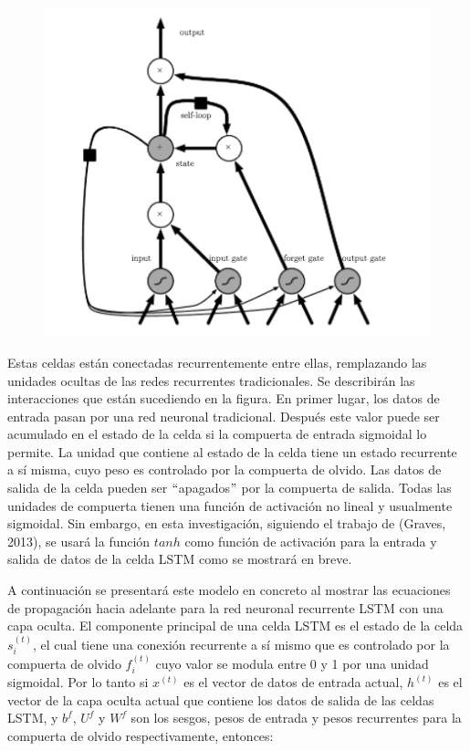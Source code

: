 \begin{figure}[h]
\begin{center}
\includegraphics{./imag/lstm.png}
\end{center}
\caption{}
\end{figure}

Estas celdas están conectadas recurrentemente entre ellas, remplazando las unidades ocultas de las redes recurrentes tradicionales. Se describirán las interacciones que están sucediendo en la figura. En primer lugar, los datos de entrada pasan por una red neuronal tradicional. Después este valor puede ser acumulado en el estado de la celda si la compuerta de entrada sigmoidal lo permite. La unidad que contiene al estado de la celda tiene un estado recurrente a sí misma, cuyo peso es controlado por la compuerta de olvido. Las datos de salida de la celda pueden ser $``$apagados$"$ por la compuerta de salida. Todas las unidades de compuerta tienen una función de activación no lineal y usualmente sigmoidal. Sin embargo, en esta investigación, siguiendo el trabajo de (Graves, 2013), se usará la función $tanh$ como función de activación para la entrada y salida de datos de la celda LSTM como se mostrará en breve.
\cite{goodfellow-et-al-2016}
\cite{DBLP:journals/corr/Graves13}
\cite{DBLP:journals/corr/SakSB14}

\vspace{1em}

A continuación se presentará este modelo en concreto al mostrar las ecuaciones de propagación hacia adelante para la red neuronal recurrente LSTM con una capa oculta. El componente principal de una celda LSTM es el estado de la celda $s_i^{(t)}$, el cual tiene una conexión recurrente a sí mismo que es controlado por la compuerta de olvido $f_i^{(t)}$ cuyo valor se modula entre 0 y 1 por una unidad sigmoidal. Por lo tanto si $x^{(t)}$ es el vector de datos de entrada actual, $h^{(t)}$ es el vector de la capa oculta actual que contiene los datos de salida de las celdas LSTM, y $b^f$, $U^f$ y $W^f$ son los sesgos, pesos de entrada y pesos recurrentes para la compuerta de olvido respectivamente, entonces:
\cite{goodfellow-et-al-2016}
\cite{DBLP:journals/corr/Graves13}
\cite{DBLP:journals/corr/SakSB14}

